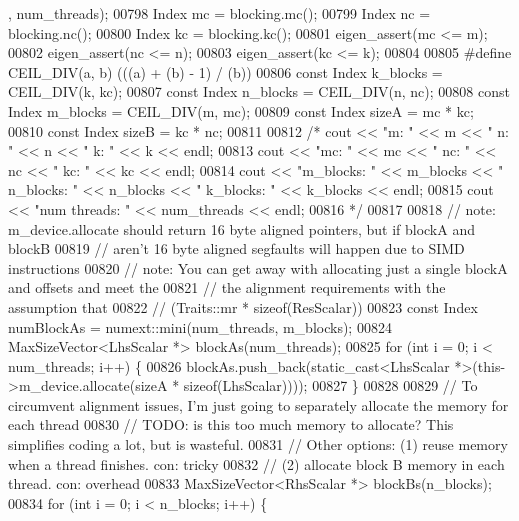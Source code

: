 \begin{DoxyCode}
      , num\_threads);
00798     Index mc = blocking.mc();
00799     Index nc = blocking.nc();
00800     Index kc = blocking.kc();
00801     eigen\_assert(mc <= m);
00802     eigen\_assert(nc <= n);
00803     eigen\_assert(kc <= k);
00804 
00805 \textcolor{preprocessor}{#define CEIL\_DIV(a, b) (((a) + (b) - 1) / (b))}
00806     \textcolor{keyword}{const} Index k\_blocks = CEIL\_DIV(k, kc);
00807     \textcolor{keyword}{const} Index n\_blocks = CEIL\_DIV(n, nc);
00808     \textcolor{keyword}{const} Index m\_blocks = CEIL\_DIV(m, mc);
00809     \textcolor{keyword}{const} Index sizeA = mc * kc;
00810     \textcolor{keyword}{const} Index sizeB = kc * nc;
00811 
00812     \textcolor{comment}{/*    cout << "m: " << m << " n: " << n << " k: " << k << endl;}
00813 \textcolor{comment}{    cout << "mc: " << mc << " nc: " << nc << " kc: " << kc << endl;}
00814 \textcolor{comment}{    cout << "m\_blocks: " << m\_blocks << " n\_blocks: " << n\_blocks << " k\_blocks: " << k\_blocks << endl;}
00815 \textcolor{comment}{    cout << "num threads: " << num\_threads << endl;}
00816 \textcolor{comment}{    */}
00817 
00818     \textcolor{comment}{// note: m\_device.allocate should return 16 byte aligned pointers, but if blockA and blockB}
00819     \textcolor{comment}{//       aren't 16 byte aligned segfaults will happen due to SIMD instructions}
00820     \textcolor{comment}{// note: You can get away with allocating just a single blockA and offsets and meet the}
00821     \textcolor{comment}{//       the alignment requirements with the assumption that}
00822     \textcolor{comment}{//       (Traits::mr * sizeof(ResScalar)) %
00823     \textcolor{keyword}{const} Index numBlockAs = numext::mini(num\_threads, m\_blocks);
00824     MaxSizeVector<LhsScalar *> blockAs(num\_threads);
00825     \textcolor{keywordflow}{for} (\textcolor{keywordtype}{int} i = 0; i < num\_threads; i++) \{
00826       blockAs.push\_back(static\_cast<LhsScalar *>(this->m\_device.allocate(sizeA * \textcolor{keyword}{sizeof}(LhsScalar))));
00827     \}
00828 
00829     \textcolor{comment}{// To circumvent alignment issues, I'm just going to separately allocate the memory for each thread}
00830     \textcolor{comment}{// TODO: is this too much memory to allocate? This simplifies coding a lot, but is wasteful.}
00831     \textcolor{comment}{//       Other options: (1) reuse memory when a thread finishes. con: tricky}
00832     \textcolor{comment}{//                      (2) allocate block B memory in each thread. con: overhead}
00833     MaxSizeVector<RhsScalar *> blockBs(n\_blocks);
00834     \textcolor{keywordflow}{for} (\textcolor{keywordtype}{int} i = 0; i < n\_blocks; i++) \{
}
\end{DoxyCode}
